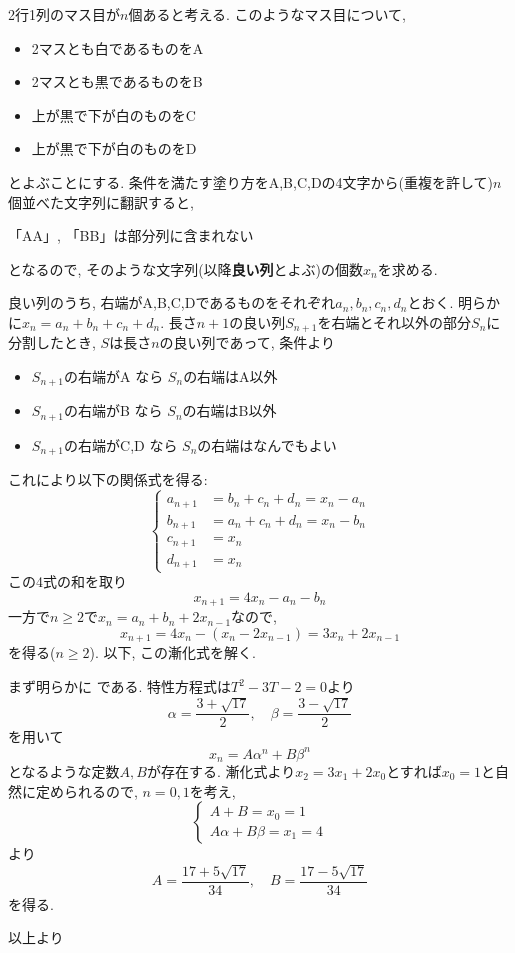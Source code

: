2行1列のマス目が$n$個あると考える. このようなマス目について,
\begin{itemize}
    \item 2マスとも白であるものをA
    \item 2マスとも黒であるものをB
    \item 上が黒で下が白のものをC
    \item 上が黒で下が白のものをD
\end{itemize}
とよぶことにする. 条件を満たす塗り方をA,B,C,Dの4文字から(重複を許して)$n$個並べた文字列に翻訳すると,
\begin{center}
「AA」, 「BB」は部分列に含まれない
\end{center}
となるので, そのような文字列(以降\textbf{良い列}とよぶ)の個数$x_n$を求める.

良い列のうち, 右端がA,B,C,Dであるものをそれぞれ$a_n,b_n,c_n,d_n$とおく. 明らかに$x_n = a_n + b_n + c_n + d_n$. 長さ$n+1$の良い列$S_{n+1}$を右端とそれ以外の部分$S_n$に分割したとき, $S$は長さ$n$の良い列であって, 条件より
\begin{itemize}
\item $S_{n+1}$の右端がA なら $S_n$の右端はA以外
\item $S_{n+1}$の右端がB なら $S_n$の右端はB以外
\item $S_{n+1}$の右端がC,D なら $S_n$の右端はなんでもよい
\end{itemize}
これにより以下の関係式を得る:
\[
\begin{cases}
a_{n+1} &= b_n + c_n + d_n = x_n - a_n\\
b_{n+1} &= a_n + c_n + d_n = x_n - b_n\\
c_{n+1} &= x_n \\
d_{n+1} &= x_n
\end{cases}
\]
この4式の和を取り
\[
x_{n+1} = 4x_{n} - a_n - b_n
\]
一方で$n\geq 2$で$x_{n} = a_n + b_n + 2x_{n-1}$なので,
\[
x_{n+1} = 4x_n - (x_n - 2x_{n-1}) = 3x_n + 2x_{n-1}
\]
を得る($n\geq 2$). 以下, この漸化式を解く.

まず明らかに
である. 特性方程式は$T^2 - 3T - 2 = 0$より
\[
\alpha = \dfrac{3 + \sqrt{17}}{2},\quad \beta = \dfrac{3-\sqrt{17}}{2}
\]
を用いて
\[
x_n = A\alpha^n + B\beta^n
\]
となるような定数$A,B$が存在する. 漸化式より$x_2 = 3x_1 + 2x_0$とすれば$x_0 = 1$と自然に定められるので, $n=0,1$を考え,
\[
\begin{cases}
A + B = x_0 = 1 \\
A\alpha + B\beta = x_1 =  4
\end{cases}
\]
より
\[
A = \dfrac{17 + 5\sqrt{17}}{34}, \quad B = \dfrac{17 - 5\sqrt{17}}{34}
\]
を得る.

以上より
{\scriptsize
}
